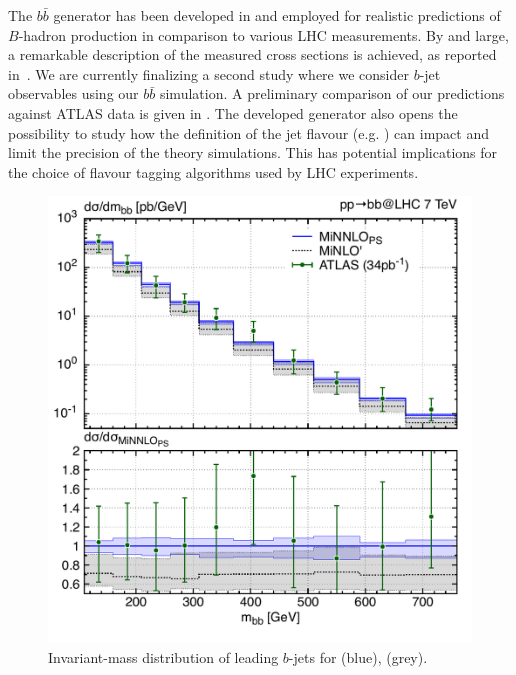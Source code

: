 \documentclass{FBR_Bericht_2025}
\begin{document}
\begin{refsection}
The $b\bar b$ \minnlo{} generator has been developed in  and employed for 
realistic predictions of $B$-hadron production in comparison to various LHC measurements.
By and large, a remarkable description of the measured cross sections is achieved, as reported in~. 
We are currently finalizing a second study where we 
consider $b$-jet observables using our $b\bar b$ \minnlo{} simulation.
%
A preliminary comparison of our \minnlo{} predictions against ATLAS data is given in 
.
%
The developed generator also opens the possibility to study how the definition of the jet flavour (e.g. ) can impact and limit the precision of the theory simulations.
This has potential implications for the choice of flavour tagging algorithms used by LHC experiments.
%


\begin{figure}[h!]
\begin{center}
\includegraphics[width=0.95\linewidth]{plots/bjet_mbb.pdf}
\caption{Invariant-mass distribution of leading $b$-jets for \minnlo{} (blue), \minlo{} (grey).}
\label{fig:bb}
\end{center}
\end{figure}
%

\end{refsection}
\end{document}
